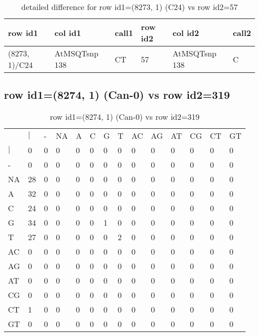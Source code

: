 \begin{center}
\begin{longtable}{|l|l|l|l|l|l|}
\caption{detailed difference for row id1=(8273, 1) (C24) vs row id2=57} \label{table_dm429}\\
\hline
row id1&col id1&call1&row id2&col id2&call2\\
\hline
(8273, 1)/C24&AtMSQTsnp 138&CT&57&AtMSQTsnp 138&C\\
\hline
\end{longtable}
\end{center}

\subsection{row id1=(8274, 1) (Can-0) vs row id2=319}
\begin{center}
\begin{longtable}{|l|l|l|l|l|l|l|l|l|l|l|l|l|l|}
\caption{row id1=(8274, 1) (Can-0) vs row id2=319} \label{table_dm430}\\
\hline
\\
\hline
&$|$&-&NA&A&C&G&T&AC&AG&AT&CG&CT&GT\\
$|$&0&0&0&0&0&0&0&0&0&0&0&0&0\\
-&0&0&0&0&0&0&0&0&0&0&0&0&0\\
NA&28&0&0&0&0&0&0&0&0&0&0&0&0\\
A&32&0&0&0&0&0&0&0&0&0&0&0&0\\
C&24&0&0&0&0&0&0&0&0&0&0&0&0\\
G&34&0&0&0&0&1&0&0&0&0&0&0&0\\
T&27&0&0&0&0&0&2&0&0&0&0&0&0\\
AC&0&0&0&0&0&0&0&0&0&0&0&0&0\\
AG&0&0&0&0&0&0&0&0&0&0&0&0&0\\
AT&0&0&0&0&0&0&0&0&0&0&0&0&0\\
CG&0&0&0&0&0&0&0&0&0&0&0&0&0\\
CT&1&0&0&0&0&0&0&0&0&0&0&0&0\\
GT&0&0&0&0&0&0&0&0&0&0&0&0&0\\
\hline
\end{longtable}
\end{center}

